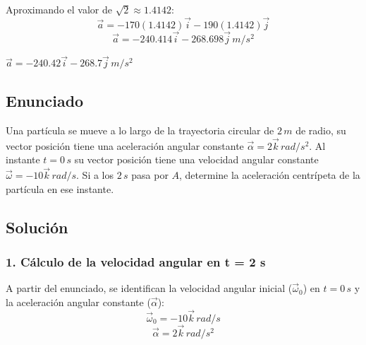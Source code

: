 \documentclass[12pt, a4paper]{article}
\begin{document}
Aproximando el valor de $\sqrt{2} \approx 1.4142$:
$$ \vec{a} = -170(1.4142)\vec{i} - 190(1.4142)\vec{j} $$
$$ \vec{a} = -240.414\vec{i} - 268.698\vec{j} \, \si{m/s^2} $$

\begin{tcolorbox}[colback=green!5!white, colframe=green!50!black, title=Respuesta Final]
\centering \Large $\vec{a} = -240.42\vec{i} - 268.7\vec{j} \, \si{m/s^2}$
\end{tcolorbox}

\newpage

\subsection*{Enunciado}
Una partícula se mueve a lo largo de la trayectoria circular de $2 \, \si{m}$ de radio, su vector posición tiene una aceleración angular constante $\vec{\alpha} = 2\vec{k} \, \si{rad/s^2}$. Al instante $t = 0 \, \si{s}$ su vector posición tiene una velocidad angular constante $\vec{\omega} = -10\vec{k} \, \si{rad/s}$. Si a los $2 \, \si{s}$ pasa por $A$, determine la aceleración centrípeta de la partícula en ese instante. 

\begin{center}
\end{center}

\subsection*{Solución}

\subsubsection*{1. Cálculo de la velocidad angular en t = 2 s}
A partir del enunciado, se identifican la velocidad angular inicial ($\vec{\omega}_0$) en $t = 0 \, \si{s}$ y la aceleración angular constante ($\vec{\alpha}$):
$$ \vec{\omega}_0 = -10\vec{k} \, \si{rad/s} $$
$$ \vec{\alpha} = 2\vec{k} \, \si{rad/s^2} $$
\end{document}
